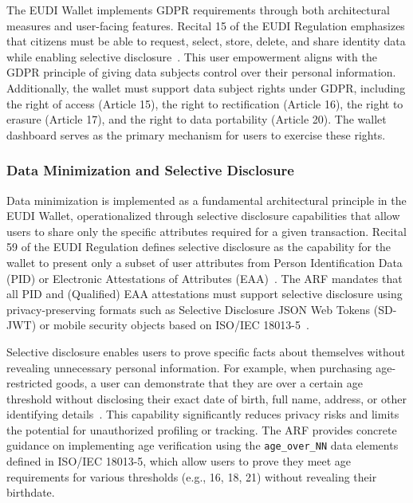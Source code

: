 \documentclass[sigconf,balance,nonacm,authordraft]{acmart}
\begin{document}
The EUDI Wallet implements GDPR requirements through both architectural measures and user-facing features. Recital 15 of the EUDI Regulation emphasizes that citizens must be able to request, select, store, delete, and share identity data while enabling selective disclosure~\cite{ZKPDiscussion_Recital15}. This user empowerment aligns with the GDPR principle of giving data subjects control over their personal information. Additionally, the wallet must support data subject rights under GDPR, including the right of access (Article 15), the right to rectification (Article 16), the right to erasure (Article 17), and the right to data portability (Article 20). The wallet dashboard serves as the primary mechanism for users to exercise these rights.

\subsubsection{Data Minimization and Selective Disclosure}

Data minimization is implemented as a fundamental architectural principle in the EUDI Wallet, operationalized through selective disclosure capabilities that allow users to share only the specific attributes required for a given transaction. Recital 59 of the EUDI Regulation defines selective disclosure as the capability for the wallet to present only a subset of user attributes from Person Identification Data (PID) or Electronic Attestations of Attributes (EAA)~\cite{ZKPDiscussion_Recital59,ARF_SelectDisclosureDefinition}. The ARF mandates that all PID and (Qualified) EAA attestations must support selective disclosure using privacy-preserving formats such as Selective Disclosure JSON Web Tokens (SD-JWT) or mobile security objects based on ISO/IEC 18013-5~\cite{ARF_AttestationSelectiveDisclosure}.

Selective disclosure enables users to prove specific facts about themselves without revealing unnecessary personal information. For example, when purchasing age-restricted goods, a user can demonstrate that they are over a certain age threshold without disclosing their exact date of birth, full name, address, or other identifying details~\cite{ISC2_SelectDisclosureExample,DocuSign_SelectDisclosure}. This capability significantly reduces privacy risks and limits the potential for unauthorized profiling or tracking. The ARF provides concrete guidance on implementing age verification using the \texttt{age\_over\_NN} data elements defined in ISO/IEC 18013-5, which allow users to prove they meet age requirements for various thresholds (e.g., 16, 18, 21) without revealing their birthdate.
\end{document}
